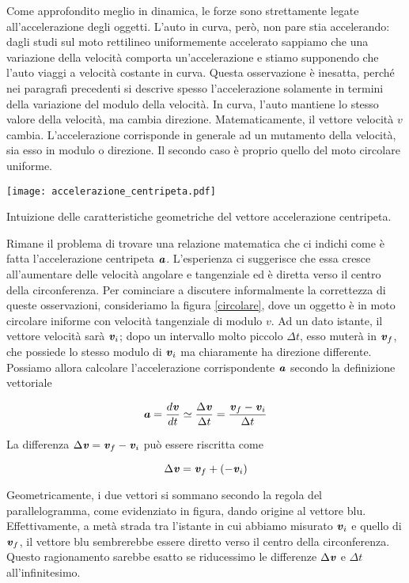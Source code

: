 Come approfondito meglio in dinamica, le forze sono
strettamente legate all'accelerazione degli oggetti. L'auto in curva,
però, non pare stia accelerando: dagli studi sul moto rettilineo
uniformemente accelerato sappiamo che una variazione della velocità
comporta un'accelerazione e stiamo supponendo che l'auto viaggi a velocità
costante in curva. Questa osservazione è inesatta, perché nei
paragrafi precedenti si descrive spesso l'accelerazione solamente in
termini della variazione del modulo della velocità. In curva, l'auto
mantiene lo stesso valore della velocità, ma cambia direzione.
Matematicamente, il vettore velocità $v$ cambia. L'accelerazione
corrisponde in generale ad un mutamento della velocità, sia esso in
modulo o direzione. Il secondo caso è proprio quello del moto circolare
uniforme.

\begin{marginfigure}
    \centering
    \texttt{[image: accelerazione\_centripeta.pdf]}
    \caption{Intuizione delle caratteristiche geometriche del vettore accelerazione centripeta.}
    \label{circolare}
\end{marginfigure}

Rimane il problema di trovare una relazione matematica che ci indichi
come è fatta l'accelerazione centripeta $\textbf{\textit{a}}$. L'esperienza
ci suggerisce che essa cresce all'aumentare delle velocità angolare
e tangenziale ed è diretta verso il centro della circonferenza.
Per cominciare a discutere informalmente la correttezza di queste
osservazioni, consideriamo la figura \ref{circolare}, dove un oggetto è in moto
circolare iniforme con velocità tangenziale di modulo $v$. Ad un
dato istante, il vettore velocità sarà $\textbf{\textit{v}}_i$; dopo un
intervallo molto piccolo $\Delta t$, esso muterà in $\textbf{\textit{v}}_f$,
che possiede
lo stesso modulo di $\textbf{\textit{v}}_i$ ma chiaramente ha direzione
differente. Possiamo allora calcolare l'accelerazione corrispondente
$\textbf{\textit{a}}$ secondo la definizione vettoriale

\[ \textbf{\textit{a}} = \frac{d\textbf{\textit{v}}}{dt} \simeq \frac{\Delta \textbf{\textit{v}}}{\Delta t} = \frac{\textbf{\textit{v}}_f - \textbf{\textit{v}}_i}{\Delta t} \]

\noindent La differenza $\Delta \textbf{\textit{v}} = \textbf{\textit{v}}_f - \textbf{\textit{v}}_i$
può essere riscritta come

\[ \Delta \textbf{\textit{v}} = \textbf{\textit{v}}_f + (-\textbf{\textit{v}}_i) \]

\noindent Geometricamente, i due vettori si sommano secondo la
regola del parallelogramma, come evidenziato in figura, dando origine
al vettore blu. Effettivamente, a metà strada tra l'istante in cui
abbiamo misurato $\textbf{\textit{v}}_i$ e quello di $\textbf{\textit{v}}_f$, il
vettore blu sembrerebbe essere diretto verso il centro della circonferenza.
Questo ragionamento sarebbe esatto se riducessimo
le differenze $\Delta \textbf{\textit{v}}$ e $\Delta t$ all'infinitesimo.

